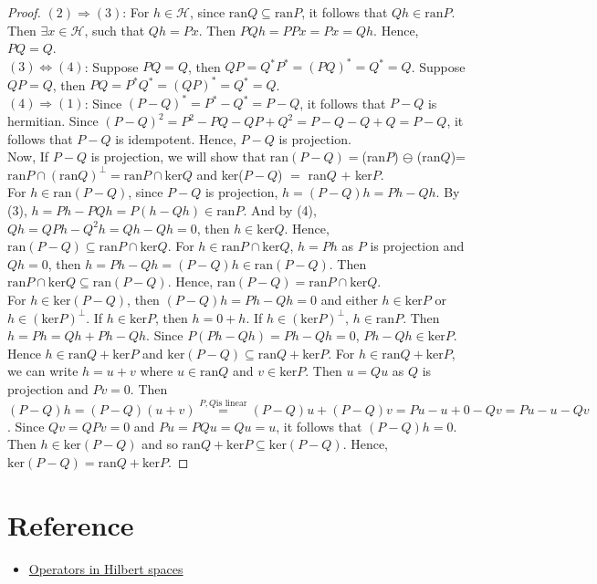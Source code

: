 \begin{proof}
    $(2)\Rightarrow (3)$: 
    For $h\in\mathscr{H}$, since $\text{ran}Q\subseteq \text{ran}P$, 
    it follows that $Qh\in\text{ran}P$. Then $\exists x\in \mathscr{H}$, such that $Qh=Px$.
    Then $PQh=PPx=Px=Qh$. Hence, $PQ=Q$.\\
    $(3)\Leftrightarrow (4)$:
    Suppose $PQ=Q$, then $QP=Q^*P^*=(PQ)^*=Q^*=Q$. 
    Suppose $QP=Q$, then $PQ=P^*Q^*=(QP)^*=Q^*=Q$.\\
    $(4)\Rightarrow (1)$:
    Since $(P-Q)^*=P^*-Q^*=P-Q$, it follows that $P-Q$ is hermitian.
    Since $(P-Q)^2=P^2-PQ-QP+Q^2=P-Q-Q+Q=P-Q$, it follows that $P-Q$ is idempotent.
    Hence, $P-Q$ is projection.\\
    Now, If $P-Q$ is projection, we will show that $\text{ran}(P-Q)=$(ran$P$) $\ominus$ (ran$Q$)=$\text{ran}P\cap (\text{ran}Q)^{\perp}=\text{ran}P\cap \text{ker}Q$
    and ker($P-Q$) $=$ ran$Q$ $+$ ker$P$.\\
    For $h\in \text{ran}(P-Q)$, since $P-Q$ is projection, $h=(P-Q)h=Ph-Qh$.
    By (3), $h=Ph-PQh=P(h-Qh)\in\text{ran}P$. And by (4), $Qh=QPh-Q^2h=Qh-Qh=0$, then $h\in\text{ker}Q$.
    Hence, $\text{ran}(P-Q)\subseteq \text{ran}P\cap \text{ker}Q$.
    For $h\in \text{ran}P\cap \text{ker}Q$, $h=Ph$ as $P$ is projection 
    and $Qh=0$, then $h=Ph-Qh=(P-Q)h\in\text{ran}(P-Q)$. Then $\text{ran}P\cap \text{ker}Q\subseteq \text{ran}(P-Q)$.
    Hence, $\text{ran}(P-Q)=\text{ran}P\cap \text{ker}Q$.\\
    For $h\in\text{ker}(P-Q)$, 
    then $(P-Q)h=Ph-Qh=0$ and either $h\in\text{ker}P$ or $h\in (\text{ker}P)^{\perp}$.
    If $h\in \text{ker}P$, then $h=0+h$. If $h\in (\text{ker}P)^{\perp}$, $h\in \text{ran}P$.
    Then $h=Ph=Qh+Ph-Qh$. Since $P(Ph-Qh)=Ph-Qh=0$, $Ph-Qh\in\text{ker}P$.
    Hence $h\in\text{ran}Q+\text{ker}P$ and $\text{ker}(P-Q)\subseteq \text{ran}Q+\text{ker}P$.
    For $h\in \text{ran}Q + \text{ker}P$, we can write $h=u+v$ where $u\in\text{ran}Q$ and $v\in\text{ker}P$.
    Then $u=Qu$ as $Q$ is projection and $Pv=0$.
    Then $(P-Q)h=(P-Q)(u+v)\overset{P,Q \text{is linear}}{=}(P-Q)u+(P-Q)v=Pu-u+0-Qv=Pu-u-Qv$.
    Since $Qv=QPv=0$ and $Pu=PQu=Qu=u$, it follows that $(P-Q)h=0$.
    Then $h\in\text{ker}(P-Q)$ and so $\text{ran}Q+\text{ker}P\subseteq \text{ker}(P-Q)$.
    Hence, $\text{ker}(P-Q)=\text{ran}Q+\text{ker}P$.

\end{proof}

\section{Reference}

\begin{itemize}
    \item \href{https://math.ou.edu/~cremling/teaching/lecturenotes/fa-new/ln6.pdf}{Operators in Hilbert spaces}
\end{itemize}